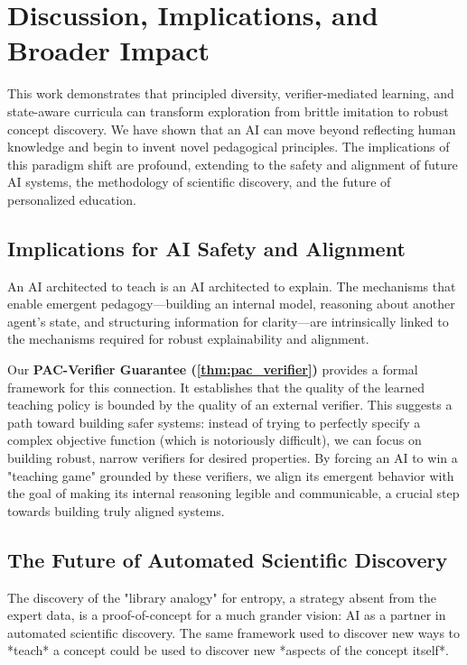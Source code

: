 \chapter{Discussion, Implications, and Broader Impact}
\label{chap:broader}

This work demonstrates that principled diversity, verifier-mediated learning, and state-aware curricula can transform exploration from brittle imitation to robust concept discovery. We have shown that an AI can move beyond reflecting human knowledge and begin to invent novel pedagogical principles. The implications of this paradigm shift are profound, extending to the safety and alignment of future AI systems, the methodology of scientific discovery, and the future of personalized education.

\section{Implications for AI Safety and Alignment}
An AI architected to teach is an AI architected to explain. The mechanisms that enable emergent pedagogy—building an internal model, reasoning about another agent's state, and structuring information for clarity—are intrinsically linked to the mechanisms required for robust explainability and alignment.

Our \textbf{PAC-Verifier Guarantee (\cref{thm:pac_verifier})} provides a formal framework for this connection. It establishes that the quality of the learned teaching policy is bounded by the quality of an external verifier. This suggests a path toward building safer systems: instead of trying to perfectly specify a complex objective function (which is notoriously difficult), we can focus on building robust, narrow verifiers for desired properties. By forcing an AI to win a "teaching game" grounded by these verifiers, we align its emergent behavior with the goal of making its internal reasoning legible and communicable, a crucial step towards building truly aligned systems.

\section{The Future of Automated Scientific Discovery}
The discovery of the "library analogy" for entropy, a strategy absent from the expert data, is a proof-of-concept for a much grander vision: AI as a partner in automated scientific discovery. The same framework used to discover new ways to *teach* a concept could be used to discover new *aspects of the concept itself*.

